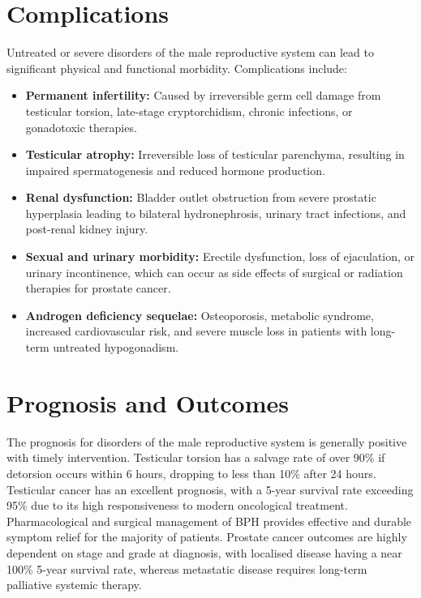\section*{Complications}
Untreated or severe disorders of the male reproductive system can lead to significant physical and functional morbidity. Complications include:
\begin{itemize}
    \item \textbf{Permanent infertility:} Caused by irreversible germ cell damage from testicular torsion, late-stage cryptorchidism, chronic infections, or gonadotoxic therapies.
    \item \textbf{Testicular atrophy:} Irreversible loss of testicular parenchyma, resulting in impaired spermatogenesis and reduced hormone production.
    \item \textbf{Renal dysfunction:} Bladder outlet obstruction from severe prostatic hyperplasia leading to bilateral hydronephrosis, urinary tract infections, and post-renal kidney injury.
    \item \textbf{Sexual and urinary morbidity:} Erectile dysfunction, loss of ejaculation, or urinary incontinence, which can occur as side effects of surgical or radiation therapies for prostate cancer.
    \item \textbf{Androgen deficiency sequelae:} Osteoporosis, metabolic syndrome, increased cardiovascular risk, and severe muscle loss in patients with long-term untreated hypogonadism.
\end{itemize}

\section*{Prognosis and Outcomes}
The prognosis for disorders of the male reproductive system is generally positive with timely intervention. Testicular torsion has a salvage rate of over 90\% if detorsion occurs within 6 hours, dropping to less than 10\% after 24 hours. Testicular cancer has an excellent prognosis, with a 5-year survival rate exceeding 95\% due to its high responsiveness to modern oncological treatment. Pharmacological and surgical management of BPH provides effective and durable symptom relief for the majority of patients. Prostate cancer outcomes are highly dependent on stage and grade at diagnosis, with localised disease having a near 100\% 5-year survival rate, whereas metastatic disease requires long-term palliative systemic therapy.

